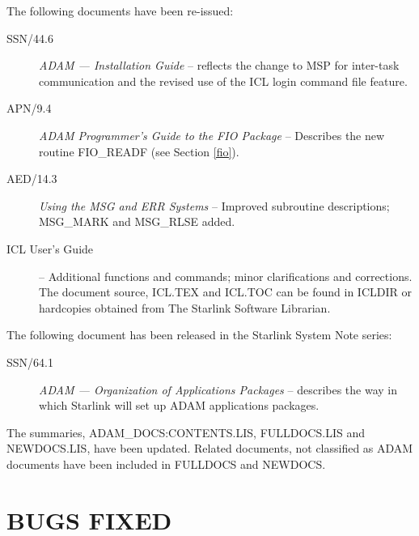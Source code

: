 The following documents have been re-issued:
\begin{description}
\item[SSN/44.6] {\it ADAM --- Installation Guide} -- reflects the change to MSP 
for inter-task communication and the revised use of the ICL login command file
feature.
\item[APN/9.4] {\it ADAM Programmer's Guide to the FIO Package} -- Describes the
new routine FIO\_READF (see Section \ref{fio}).
\item[AED/14.3] {\it Using the MSG and ERR Systems} -- Improved subroutine
descriptions; MSG\_MARK and MSG\_RLSE added.
\item[ICL User's Guide] -- Additional functions and commands; minor 
clarifications and corrections.
The document source, ICL.TEX and ICL.TOC can be found in ICLDIR or hardcopies
obtained from The Starlink Software Librarian.
\end{description}

The following document has been released in the Starlink System Note series:
\begin{description}
\item[SSN/64.1] {\it ADAM --- Organization of Applications Packages} --
describes the way in which Starlink will set up ADAM applications packages.
\end{description}

The summaries, ADAM\_DOCS:CONTENTS.LIS, FULLDOCS.LIS and NEWDOCS.LIS, have been 
updated. 
Related documents, not classified as ADAM documents have been included in 
FULLDOCS and NEWDOCS.

\section{BUGS FIXED}
\label{bugfix}

